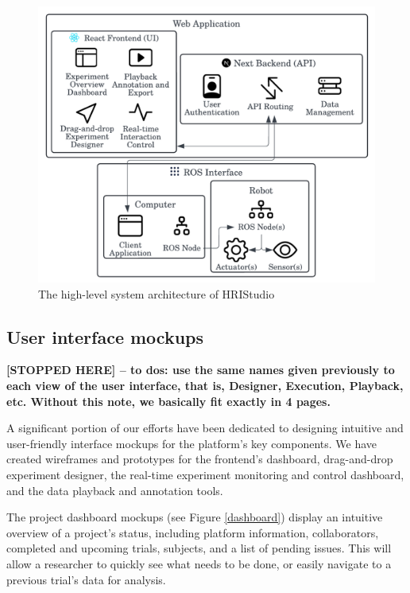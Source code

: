 \documentclass[letterpaper, 10 pt, conference]{ieeeconf}
\begin{document}
\begin{figure}[ht]
   \vskip -0.3cm
    \begin{center}
        \includegraphics[width=0.4\paperwidth]{assets/diagrams/highlevelarchitecture}
        \vskip -0.3cm
        \caption{The high-level system architecture of HRIStudio}
        \label{highlevelarchitecture}
    \end{center}
     \vskip -0.7cm
\end{figure}

\subsection{User interface mockups}

{\bf [STOPPED HERE] -- to dos: use the same names given previously to each view of the user interface, that is, Designer, Execution, Playback, etc. Without this note, we basically fit exactly in 4 pages.}

A significant portion of our efforts have been dedicated to designing intuitive and user-friendly interface mockups for the platform's key components. We have created wireframes and prototypes for the frontend's dashboard, drag-and-drop experiment designer, the real-time experiment monitoring and control dashboard, and the data playback and annotation tools.

The project dashboard mockups (see Figure \ref{dashboard}) display an intuitive overview of a project's status, including platform information, collaborators, completed and upcoming trials, subjects, and a list of pending issues. This will allow a researcher to quickly see what needs to be done, or easily navigate to a previous trial's data for analysis.
\end{document}
